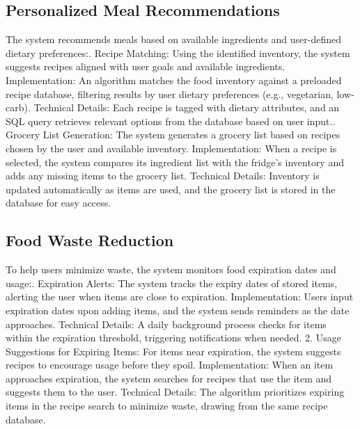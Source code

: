 \documentclass[conference]{IEEEtran}
\begin{document}
\subsection{Personalized Meal Recommendations}
The system recommends meals based on available ingredients and user-defined dietary preferences:. Recipe Matching:\newline
         Using the identified inventory, the system suggests recipes aligned with user goals and available ingredients.\newline
         Implementation: An algorithm matches the food inventory against a preloaded recipe database, filtering results by user dietary preferences (e.g., vegetarian, low-carb).\newline
         Technical Details: Each recipe is tagged with dietary attributes, and an SQL query retrieves relevant options from the database based on user input.. Grocery List Generation:\newline
         The system generates a grocery list based on recipes chosen by the user and available inventory.\newline
         Implementation: When a recipe is selected, the system compares its ingredient list with the fridge’s inventory and adds any missing items to the grocery list.\newline
         Technical Details: Inventory is updated automatically as items are used, and the grocery list is stored in the database for easy access.
\subsection{Food Waste Reduction}
To help users minimize waste, the system monitors food expiration dates and usage:. Expiration Alerts:\newline
        The system tracks the expiry dates of stored items, alerting the user when items are close to expiration.\newline
        Implementation: Users input expiration dates upon adding items, and the system sends reminders as the date approaches.\newline
        Technical Details: A daily background process checks for items within the expiration threshold, triggering notifications when needed.
    2. Usage Suggestions for Expiring Items:\newline
        For items near expiration, the system suggests recipes to encourage usage before they spoil.\newline
        Implementation: When an item approaches expiration, the system searches for recipes that use the item and suggests them to the user.
        Technical Details: The algorithm prioritizes expiring items in the recipe search to minimize waste, drawing from the same recipe database.\newline
\end{document}
